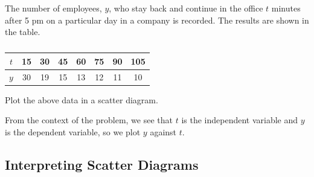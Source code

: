 \begin{sample}
    The number of employees, $y$, who stay back and continue in the office $t$ minutes after 5 pm on a particular day in a company is recorded. The results are shown in the table.

    \begin{table}[H]
        \centering
        \begin{tabular}{|c|c|c|c|c|c|c|c|}
        \hline
        $t$ & 15 & 30 & 45 & 60 & 75 & 90 & 105 \\ \hline
        $y$ & 30 & 19 & 15 & 13 & 12 & 11 & 10 \\ \hline
        \end{tabular}
        \caption{}
    \end{table}

    Plot the above data in a scatter diagram.
\end{sample}
\begin{sampans}
    From the context of the problem, we see that $t$ is the independent variable and $y$ is the dependent variable, so we plot $y$ against $t$.

    \begin{figure}[H]
        \centering
        \caption{}
    \end{figure}
\end{sampans}

\subsection{Interpreting Scatter Diagrams}


